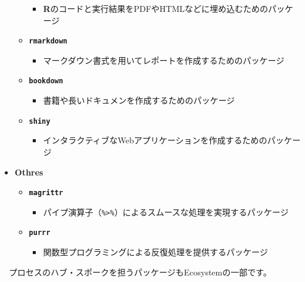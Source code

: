 \documentclass[
  12pt,
]{book}
\providecommand{\tightlist}{%
  \setlength{\itemsep}{0pt}\setlength{\parskip}{0pt}}
\begin{document}
\begin{itemize}
\begin{itemize}
    \begin{itemize}
    \tightlist
    \item
      \textbf{R}のコードと実行結果をPDFやHTMLなどに埋め込むためのパッケージ
    \end{itemize}
  \item
    \textbf{\texttt{rmarkdown}} \citep{R-rmarkdown}

    \begin{itemize}
    \tightlist
    \item
      マークダウン書式を用いてレポートを作成するためのパッケージ
    \end{itemize}
  \item
    \textbf{\texttt{bookdown}} \citep{bookdown2016, R-bookdown}

    \begin{itemize}
    \tightlist
    \item
      書籍や長いドキュメンを作成するためのパッケージ
    \end{itemize}
  \item
    \textbf{\texttt{shiny}} \citep{R-shiny}

    \begin{itemize}
    \tightlist
    \item
      インタラクティブなWebアプリケーションを作成するためのパッケージ
    \end{itemize}
  \end{itemize}
\item
  \textbf{Othres}

  \begin{itemize}
  \tightlist
  \item
    \textbf{\texttt{magrittr}} \citep{R-magrittr}

    \begin{itemize}
    \tightlist
    \item
      パイプ演算子（\texttt{\%\textgreater{}\%}）によるスムースな処理を実現するパッケージ
    \end{itemize}
  \item
    \textbf{\texttt{purrr}} \citep{R-purrr}

    \begin{itemize}
    \tightlist
    \item
      関数型プログラミングによる反復処理を提供するパッケージ
    \end{itemize}
  \end{itemize}
\end{itemize}

　プロセスのハブ・スポークを担うパッケージもEcosystemの一部です。
\end{document}
